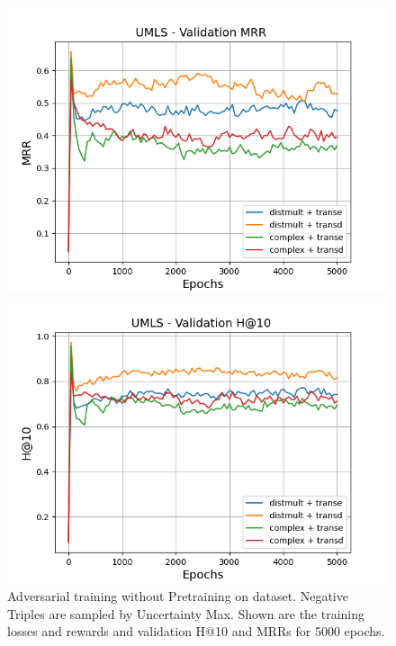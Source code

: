\begin{figure}
\begin{minipage}{.5\textwidth}
    \end{minipage}
    \begin{minipage}{.5\textwidth}
      \centering
      \includegraphics[width=0.9\linewidth]{figures/results/gan_train/not_pretrained/uncertainty/max/entropy/umls/gan_train_uncertainty_umls_mrrs.png}
    \end{minipage}%
    \begin{minipage}{.5\textwidth}
      \centering
      \includegraphics[width=0.9\linewidth]{figures/results/gan_train/not_pretrained/uncertainty/max/entropy/umls/gan_train_uncertainty_umls_hit10s.png}
    \end{minipage}%
    \caption{Adversarial training without Pretraining on \umls dataset. 
    Negative Triples are sampled by Uncertainty Max.
    Shown are the training losses and rewards and validation H@10 and MRRs for 5000 epochs.}
    \label{fig:advtrain_umls_not_pretrained_uncertainty_max}
\end{figure}

